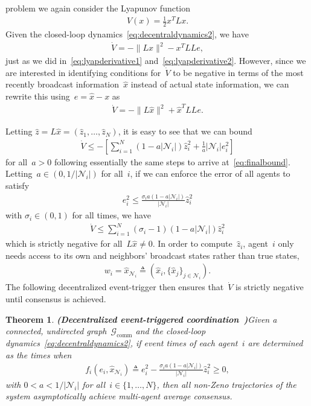 \documentclass{autart}
\newtheorem{theorem}{Theorem}[section]
\newcommand{\GG}{{\mathcal{G}}}
\newcommand{\NN}{{\mathcal{N}}}
\newcommand{\until}[1]{\{1,\dots, #1\}}
\newcommand{\commgraph}{\GG_\text{comm}}
\newcommand{\TwoNorm}[1]{\|#1\|}
\renewcommand{\hat}{\widehat}
\newcommand{\longthmtitle}[1]{\mbox{}\textup{\textbf{(#1)}}}
\begin{document}
problem we again consider the Lyapunov function
\begin{align}\label{eq:lyap}
  V(x) = \frac{1}{2}x^T L x.
\end{align}
Given the closed-loop dynamics~\eqref{eq:decentraldynamics2}, we have
\begin{align*}
  \dot{V} = -\TwoNorm{Lx}^2 - x^T L L e,
\end{align*}
just as we did in~\eqref{eq:lyapderivative1}
and~\eqref{eq:lyapderivative2}. However, since we are interested in
identifying conditions for~$\dot{V}$ to be negative in terms of the
most recently broadcast information~$\hat{x}$ instead of actual state
information, we can rewrite this using~$e = \hat{x} - x$ as
\begin{align*}
  \dot{V} = - \TwoNorm{L\hat{x}}^2 + \hat{x}^T L L e. 
\end{align*}

Letting $\hat{z} = L \hat{x} = (\hat{z}_1, \dots, \hat{z}_N)$, it is
easy to see that we can bound
\begin{align*}
  \dot{V} \leq - \left[ \sum_{i=1}^N (1 - a|\NN_i|)\hat{z}_i^2 + \frac{1}{a}
  |\NN_i| e_i^2  \right]
\end{align*}
for all~$a > 0$ following essentially the same steps to arrive
at~\eqref{eq:finalbound}.  Letting~$a \in (0,1/|\NN_i|)$ for all~$i$,
if we can enforce the error of all agents to satisfy
\begin{align}\label{eq:enforcethis}
  e_i^2 \leq \frac{\sigma_i a(1-a|\NN_i|)}{|\NN_i|} \hat{z}_i^2
\end{align}
with $\sigma_i \in (0,1)$ for all times, we have
\begin{align*}
  \dot{V} \leq \sum_{i=1}^N (\sigma_i - 1)(1 - a|\NN_i|) \hat{z}_i^2 
\end{align*}
which is strictly negative for all~$L\hat{x} \neq 0$. {
In order to compute~$\hat{z}_i$, agent~$i$ only needs access to its own and neighbors' broadcast states rather than true states,
\begin{align*}
w_i = \hat{x}_{\NN_i} \triangleq (\hat{x}_i, \{\hat{x}_j\}_{j \in \NN_i} ).
\end{align*} 
}
The following decentralized event-trigger then ensures that~$\dot{V}$ is strictly negative until
consensus is achieved.

\begin{theorem}\longthmtitle{Decentralized event-triggered
    coordination~\citep{EG-YC-HY-PA-DC:13}}\label{th:broadcast1} 
  Given {a connected, undirected graph~$\commgraph$ and} the
  closed-loop dynamics~\eqref{eq:decentraldynamics2}, if event times
  of each agent~$i$ are determined as the times when
  \begin{align}\label{eq:decentraltrigger2}
    f_i(e_i,\hat{x}_{\NN_i} ) \triangleq
    e_i^2 - \frac{\sigma_i a(1-a|\NN_i|)}{|\NN_i|} \hat{z}_i^2 \geq 0,
  \end{align}
  with $0 < a < 1/|\NN_i|$ for all~$i \in \until{N}$, then all
  non-Zeno trajectories of the system asymptotically achieve
  multi-agent average consensus.
\end{theorem}
\end{document}
